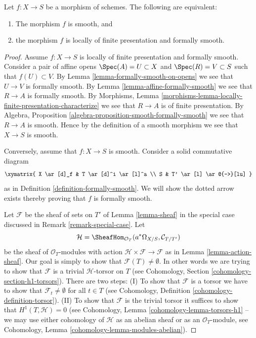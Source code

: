 \begin{lemma}
\label{lemma-smooth-formally-smooth}
Let $f : X \to S$ be a morphism of schemes.
The following are equivalent:
\begin{enumerate}
\item The morphism $f$ is smooth, and
\item the morphism $f$ is locally of finite presentation and
formally smooth.
\end{enumerate}
\end{lemma}

\begin{proof}
Assume $f : X \to S$ is locally of finite presentation and formally smooth.
Consider a pair of affine opens $\Spec(A) = U \subset X$ and
$\Spec(R) = V \subset S$
such that $f(U) \subset V$. By Lemma \ref{lemma-formally-smooth-on-opens}
we see that $U \to V$ is formally smooth. By Lemma
\ref{lemma-affine-formally-smooth} we see that $R \to A$ is formally
smooth. By
Morphisms, Lemma \ref{morphisms-lemma-locally-finite-presentation-characterize}
we see that $R \to A$ is of finite presentation.
By Algebra, Proposition \ref{algebra-proposition-smooth-formally-smooth}
we see that $R \to A$ is smooth.
Hence by the definition of a smooth morphism we see that $X \to S$ is smooth.

\medskip\noindent
Conversely, assume that $f : X \to S$ is smooth. Consider a solid commutative
diagram
$$
\xymatrix{
X \ar[d]_f & T \ar[d]^i \ar[l]^a \\
S & T' \ar[l] \ar@{-->}[lu]
}
$$
as in Definition \ref{definition-formally-smooth}.
We will show the dotted arrow exists thereby
proving that $f$ is formally smooth.

\medskip\noindent
Let $\mathcal{F}$ be the sheaf of sets on $T'$ of Lemma \ref{lemma-sheaf}
in the special case discussed in Remark \ref{remark-special-case}.
Let
$$
\mathcal{H} =
\SheafHom_{\mathcal{O}_T}(a^*\Omega_{X/S}, \mathcal{C}_{T/T'})
$$
be the sheaf of $\mathcal{O}_T$-modules with action
$\mathcal{H} \times \mathcal{F} \to \mathcal{F}$ as in
Lemma \ref{lemma-action-sheaf}. Our goal is simply
to show that $\mathcal{F}(T) \not = \emptyset$. In other words we
are trying to show that $\mathcal{F}$ is a trivial $\mathcal{H}$-torsor
on $T$ (see Cohomology, Section \ref{cohomology-section-h1-torsors}).
There are two steps: (I) To show that $\mathcal{F}$ is a torsor
we have to show that $\mathcal{F}_t \not = \emptyset$ for all $t \in T$ (see
Cohomology, Definition \ref{cohomology-definition-torsor}).
(II) To show that $\mathcal{F}$ is the trivial torsor it suffices
to show that $H^1(T, \mathcal{H}) = 0$ (see
Cohomology, Lemma \ref{cohomology-lemma-torsors-h1} --
we may use either cohomology
of $\mathcal{H}$ as an abelian sheaf or as an $\mathcal{O}_T$-module,
see Cohomology, Lemma \ref{cohomology-lemma-modules-abelian}).


\end{proof}
